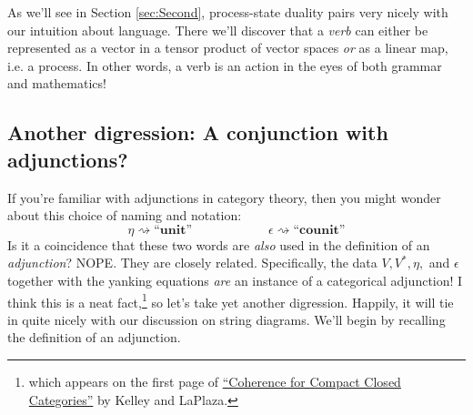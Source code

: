 \documentclass{tufte-handout-tai}
\theoremstyle{plain}
\theoremstyle{definition}
\theoremstyle{remark}
\begin{document}
As we'll see in Section \ref{sec:Second}, process-state duality pairs very nicely with our intuition about language. There we'll discover that a \textit{verb} can either be represented as a vector in a tensor product of vector spaces \textit{or} as a linear map, i.e. a process. In other words, a verb is an action in the eyes of both grammar and mathematics!

\subsection*{Another digression: A conjunction with adjunctions?}
If you're familiar with adjunctions in category theory, then you might wonder about this choice of naming and notation:
\[\eta \rightsquigarrow \textbf{``unit''}\qquad\qquad\qquad \epsilon\rightsquigarrow \textbf{``counit''}\]
Is it a coincidence that these two words are \textit{also} used in the definition of an \textit{adjunction}? NOPE. They are closely related. Specifically, the data $V,V^*,\eta,$ and $\epsilon$ together with the yanking equations \textit{are} an instance of a categorical adjunction! I think this is a neat fact,\footnote{which appears on the first page of \href{https://ac.els-cdn.com/0022404980901012/1-s2.0-0022404980901012-main.pdf?_tid=6c45bfb7-9cd3-42b1-ad62-4726b10f48e8&acdnat=1528395229_68b91be8a4ba1266aee54424771f749e}{``Coherence for Compact Closed Categories''} by Kelley and LaPlaza.} so let's take yet another digression. Happily, it will tie in quite nicely with our discussion on string diagrams. We'll begin by recalling the definition of an adjunction. 
\end{document}

